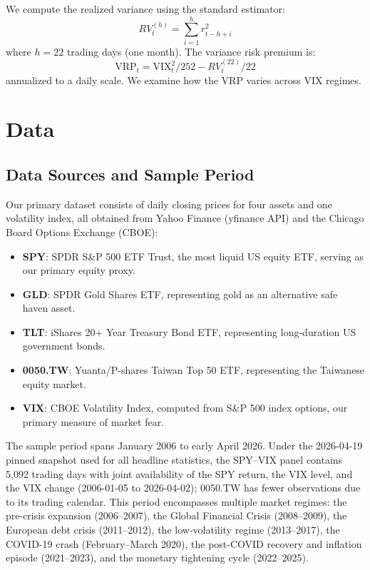 \documentclass[12pt,a4paper]{article}
\begin{document}
We compute the realized variance using the standard estimator:
\begin{equation}
RV_t^{(h)} = \sum_{i=1}^{h} r_{t-h+i}^2
\label{eq:rv}
\end{equation}
where $h = 22$ trading days (one month). The variance risk premium is:
\begin{equation}
\text{VRP}_t = \text{VIX}_t^2 / 252 - RV_t^{(22)} / 22
\label{eq:vrp}
\end{equation}
annualized to a daily scale. We examine how the VRP varies across VIX regimes.


\section{Data}
\label{sec:data}

\subsection{Data Sources and Sample Period}

Our primary dataset consists of daily closing prices for four assets and one volatility index, all obtained from Yahoo Finance (yfinance API) and the Chicago Board Options Exchange (CBOE):

\begin{itemize}
    \item \textbf{SPY}: SPDR S\&P 500 ETF Trust, the most liquid US equity ETF, serving as our primary equity proxy.
    \item \textbf{GLD}: SPDR Gold Shares ETF, representing gold as an alternative safe haven asset.
    \item \textbf{TLT}: iShares 20+ Year Treasury Bond ETF, representing long-duration US government bonds.
    \item \textbf{0050.TW}: Yuanta/P-shares Taiwan Top 50 ETF, representing the Taiwanese equity market.
    \item \textbf{VIX}: CBOE Volatility Index, computed from S\&P 500 index options, our primary measure of market fear.
\end{itemize}

The sample period spans January 2006 to early April 2026. Under the 2026-04-19 pinned snapshot used for all headline statistics, the SPY--VIX panel contains 5{,}092 trading days with joint availability of the SPY return, the VIX level, and the VIX change (2006-01-05 to 2026-04-02); 0050.TW has fewer observations due to its trading calendar. This period encompasses multiple market regimes: the pre-crisis expansion (2006--2007), the Global Financial Crisis (2008--2009), the European debt crisis (2011--2012), the low-volatility regime (2013--2017), the COVID-19 crash (February--March 2020), the post-COVID recovery and inflation episode (2021--2023), and the monetary tightening cycle (2022--2025).
\end{document}
